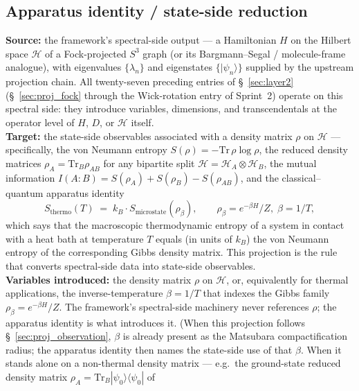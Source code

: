 \documentclass[11pt]{article}
\begin{document}
\subsection{Apparatus identity / state-side reduction}
\label{sec:proj_apparatus_identity}
\textbf{Source:} the framework's spectral-side output --- a Hamiltonian
$H$ on the Hilbert space $\mathcal{H}$ of a Fock-projected $S^3$ graph
(or its Bargmann--Segal / molecule-frame analogue), with eigenvalues
$\{\lambda_n\}$ and eigenstates $\{|\psi_n\rangle\}$ supplied by the
upstream projection chain.  All twenty-seven preceding entries of
\S~\ref{sec:layer2} (\S~\ref{sec:proj_fock} through the Wick-rotation
entry of Sprint~2) operate on this spectral side: they introduce
variables, dimensions, and transcendentals at the operator level of
$H$, $D$, or $\mathcal{H}$ itself.\\
\textbf{Target:} the state-side observables associated with a density
matrix $\rho$ on $\mathcal{H}$ --- specifically, the von Neumann entropy
$S(\rho) = -\mathrm{Tr}\,\rho \log\rho$, the reduced density matrices
$\rho_A = \mathrm{Tr}_B \rho_{AB}$ for any bipartite split
$\mathcal{H} = \mathcal{H}_A \otimes \mathcal{H}_B$, the mutual
information $I(A{:}B) = S(\rho_A) + S(\rho_B) - S(\rho_{AB})$, and the
classical--quantum apparatus identity
\begin{equation*}
   S_\mathrm{thermo}(T) \;=\; k_B \cdot S_\mathrm{microstate}(\rho_\beta),
   \qquad \rho_\beta = e^{-\beta H} / Z, \; \beta = 1/T,
\end{equation*}
which says that the macroscopic thermodynamic entropy of a system in
contact with a heat bath at temperature $T$ equals (in units of
$k_B$) the von Neumann entropy of the corresponding Gibbs density
matrix.  This projection is the rule that converts spectral-side
data into state-side observables.\\
\textbf{Variables introduced:} the density matrix $\rho$ on
$\mathcal{H}$, or, equivalently for thermal applications, the
inverse-temperature $\beta = 1/T$ that indexes the Gibbs family
$\rho_\beta = e^{-\beta H}/Z$.  The framework's spectral-side
machinery never references $\rho$; the apparatus identity is what
introduces it.  (When this projection follows
\S~\ref{sec:proj_observation}, $\beta$ is already present as the
Matsubara compactification radius; the apparatus identity then names
the state-side use of that $\beta$.  When it stands alone on a
non-thermal density matrix --- e.g.\ the ground-state reduced density
matrix $\rho_A = \mathrm{Tr}_B |\psi_0\rangle\langle\psi_0|$ of
\end{document}
